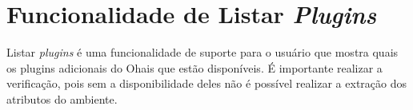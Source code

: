 \section{Funcionalidade de Listar \textit{Plugins}}
\label{sec:list}

Listar \textit{plugins} é uma funcionalidade de suporte para o usuário
que mostra quais os plugins adicionais do Ohais que estão
disponíveis. É importante realizar a verificação, pois
sem a disponibilidade deles não é possível realizar a extração
dos atributos do ambiente.
